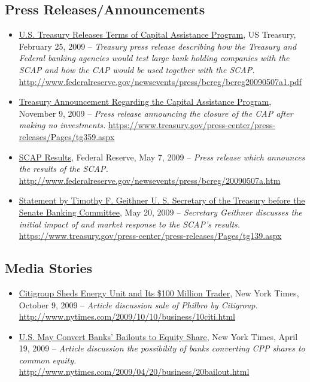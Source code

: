\documentclass[12pt]{article}
\begin{document}
\subsection{Press Releases/Announcements}

\begin{itemize}
\item
\ul{U.S. Treasury Releases Terms of Capital Assistance Program}, US Treasury, February 25, 2009 -- \emph{Treasury press release describing how the Treasury and Federal banking agencies would test large bank holding companies with the SCAP and how the CAP would be used together with the SCAP.} \url{http://www.federalreserve.gov/newsevents/press/bcreg/bcreg20090507a1.pdf}
\item
\ul{ Treasury Announcement Regarding the Capital Assistance Program}, November 9, 2009 -- \emph{Press release announcing the closure of the CAP after making no investments.} \url{https://www.treasury.gov/press-center/press-releases/Pages/tg359.aspx}
\item
\ul{SCAP
  Results}, Federal Reserve, May 7, 2009 -- \emph{Press release which
  announces the results of the SCAP.} \url{http://www.federalreserve.gov/newsevents/press/bcreg/20090507a.htm}
\item
\ul{Statement
  by Timothy F. Geithner U. S. Secretary of the Treasury before the
  Senate Banking Committee}, May 20, 2009 -- \emph{Secretary Geithner
  discusses the initial impact of and market response to the SCAP's
  results.} \url{https://www.treasury.gov/press-center/press-releases/Pages/tg139.aspx}
\end{itemize}

\subsection{Media Stories}

\begin{itemize}
\item
\ul{Citigroup Sheds Energy Unit and Its \$100 Million Trader}, New York Times, October 9,
  2009 -- \emph{Article discussion sale of Philbro by Citigroup.} \url{http://www.nytimes.com/2009/10/10/business/10citi.html}
\item
\ul{U.S. May Convert Banks’ Bailouts to Equity Share}, New York Times, April 19,
  2009 -- \emph{Article discussion the possibility of banks converting CPP shares to common equity.} \url{http://www.nytimes.com/2009/04/20/business/20bailout.html}
\end{itemize}
\end{document}
